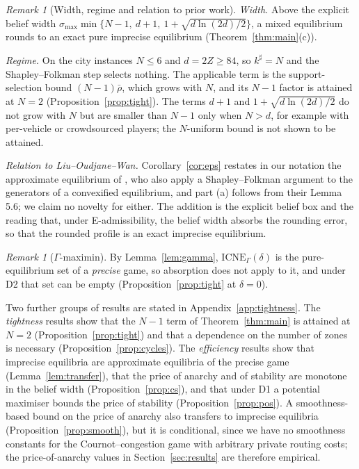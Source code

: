 \documentclass[preprint,12pt]{elsarticle}
\theoremstyle{definition}
\theoremstyle{remark}
\newtheorem{remark}[theorem]{Remark}
\newcommand{\ICNE}{\mathrm{ICNE}}
\begin{document}
\begin{remark}[Width, regime and relation to prior work]\label{rem:regime}
\emph{Width.} Above the explicit belief width $\sigma_{\max}\min\{N-1,\ d+1,\ 1+\sqrt{d\ln(2d)/2}\}$, a mixed equilibrium rounds to an exact pure imprecise equilibrium (Theorem~\ref{thm:main}(c)).

\emph{Regime.} On the city instances $N\le6$ and $d=2Z\ge84$, so $k^\sharp=N$ and the Shapley--Folkman step selects nothing. The applicable term is the support-selection bound $(N-1)\bar\rho$, which grows with $N$, and its $N-1$ factor is attained at $N=2$ (Proposition~\ref{prop:tight}). The terms $d+1$ and $1+\sqrt{d\ln(2d)/2}$ do not grow with $N$ but are smaller than $N-1$ only when $N>d$, for example with per-vehicle or crowdsourced players; the $N$-uniform bound is not shown to be attained.

\emph{Relation to Liu--Oudjane--Wan.} Corollary~\ref{cor:eps} restates in our notation the approximate equilibrium of \citet{Liu2023}, who also apply a Shapley--Folkman argument to the generators of a convexified equilibrium, and part (a) follows from their Lemma 5.6; we claim no novelty for either. The addition is the explicit belief box and the reading that, under E-admissibility, the belief width absorbs the rounding error, so that the rounded profile is an exact imprecise equilibrium.
\end{remark}

\begin{remark}[$\Gamma$-maximin]\label{rem:gamma-abs}
By Lemma~\ref{lem:gamma}, $\ICNE_\Gamma(\delta)$ is the pure-equilibrium set of a \emph{precise} game, so absorption does not apply to it, and under D2 that set can be empty (Proposition~\ref{prop:tight} at $\delta=0$).
\end{remark}

Two further groups of results are stated in Appendix~\ref{app:tightness}. The \emph{tightness} results show that the $N-1$ term of Theorem~\ref{thm:main} is attained at $N=2$ (Proposition~\ref{prop:tight}) and that a dependence on the number of zones is necessary (Proposition~\ref{prop:cycles}). The \emph{efficiency} results show that imprecise equilibria are approximate equilibria of the precise game (Lemma~\ref{lem:transfer}), that the price of anarchy and of stability are monotone in the belief width (Proposition~\ref{prop:cs}), and that under D1 a potential maximiser bounds the price of stability (Proposition~\ref{prop:pos}). A smoothness-based bound on the price of anarchy also transfers to imprecise equilibria (Proposition~\ref{prop:smooth}), but it is conditional, since we have no smoothness constants for the Cournot--congestion game with arbitrary private routing costs; the price-of-anarchy values in Section~\ref{sec:results} are therefore empirical.
\end{document}
